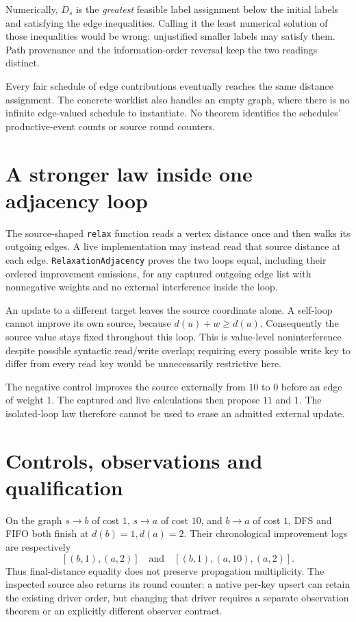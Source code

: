 \documentclass[11pt,a4paper]{article}
\newcommand{\code}[1]{\nolinkurl{#1}}
\begin{document}
Numerically, $D_s$ is the \emph{greatest} feasible label assignment below the
initial labels and satisfying the edge inequalities. Calling it the least
numerical solution of those inequalities would be wrong: unjustified smaller
labels may satisfy them. Path provenance and the information-order reversal
keep the two readings distinct.

Every fair schedule of edge contributions eventually reaches the same
distance assignment. The concrete worklist also handles an empty graph,
where there is no infinite edge-valued schedule to instantiate. No theorem
identifies the schedules' productive-event counts or source round counters.

\section{A stronger law inside one adjacency loop}

The source-shaped \code{relax} function reads a vertex distance once and then
walks its outgoing edges. A live implementation may instead read that source
distance at each edge. \code{RelaxationAdjacency} proves the two loops equal,
including their ordered improvement emissions, for any captured outgoing
edge list with nonnegative weights and no external interference inside the
loop.

An update to a different target leaves the source coordinate alone. A
self-loop cannot improve its own source, because $d(u)+w\ge d(u)$.
Consequently the source value stays fixed throughout this loop. This is
value-level noninterference despite possible syntactic read/write overlap;
requiring every possible write key to differ from every read key would be
unnecessarily restrictive here.

The negative control improves the source externally from $10$ to $0$ before
an edge of weight $1$. The captured and live calculations then propose $11$
and $1$. The isolated-loop law therefore cannot be used to erase an admitted
external update.

\section{Controls, observations and qualification}

On the graph $s\to b$ of cost $1$, $s\to a$ of cost $10$, and $b\to a$ of
cost $1$, DFS and FIFO both finish at $d(b)=1,d(a)=2$. Their chronological
improvement logs are respectively
\[
 [(b,1),(a,2)]\quad\text{and}\quad[(b,1),(a,10),(a,2)].
\]
Thus final-distance equality does not preserve propagation multiplicity.
The inspected source also returns its round counter: a native per-key upsert
can retain the existing driver order, but changing that driver requires a
separate observation theorem or an explicitly different observer contract.
\end{document}
